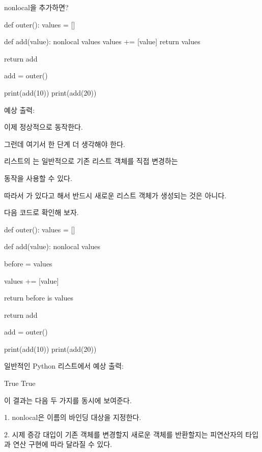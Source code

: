 \begin{dhknote}
\begin{dhksmry}[centered]
nonlocal을 추가하면?
\end{dhksmry}
\end{dhknote}

\begin{dhkcode}
def outer():
    values = []

    def add(value):
        nonlocal values
        values += [value]
        return values

    return add


add = outer()

print(add(10))
print(add(20))
\end{dhkcode}

예상 출력:

\begin{dhkzsh}
[10]
[10, 20]
\end{dhkzsh}

이제 정상적으로 동작한다.

그런데 여기서 한 단계 더 생각해야 한다.

리스트의 \zsh{+=}는 일반적으로 기존 리스트 객체를 직접 변경하는 

 동작을 사용할 수 있다.

따라서 가 있다고 해서 반드시 새로운 리스트 객체가 생성되는 것은 아니다.

다음 코드로 확인해 보자.

\begin{dhkcode}
def outer():
    values = []

    def add(value):
        nonlocal values

        before = values

        values += [value]

        return before is values

    return add


add = outer()

print(add(10))
print(add(20))
\end{dhkcode}

일반적인 Python 리스트에서 예상 출력:

\begin{dhkzsh}
True
True
\end{dhkzsh}

이 결과는 다음 두 가지를 동시에 보여준다.

\begin{dhksmry}
    1. nonlocal은 이름의 바인딩 대상을 지정한다.

    2. 시제 증강 대입이 기존 객체를 변경할지 새로운 객체를 반환할지는
       피연산자의 타입과 연산 구현에 따라 달라질 수 있다.
\end{dhksmry}

